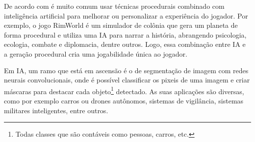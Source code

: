 


De acordo com  é muito comum usar técnicas procedurais combinado com inteligência artificial para melhorar ou personalizar a experiência do jogador. Por exemplo, o jogo RimWorld é um simulador de colônia que gera um planeta de forma procedural e utiliza uma IA para narrar a história, abrangendo psicologia, ecologia, combate e diplomacia, dentre outros. Logo, essa combinação entre IA e a geração procedural cria uma jogabilidade única ao jogador.


Em IA, um ramo que está em ascensão é o de segmentação de imagem com redes neurais convolucionais, onde é possível classificar os pixeis de uma imagem e criar máscaras  para destacar cada objeto\footnote{Todas classes que são contáveis como pessoas, carros, etc.} detectado. As suas aplicações são diversas, como por exemplo carros ou drones autônomos, sistemas de vigilância, sistemas militares inteligentes, entre outros. 

